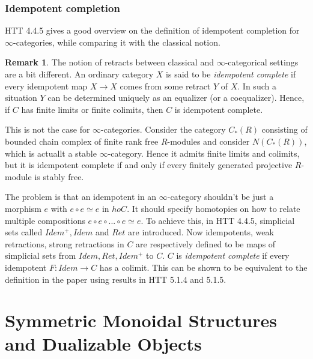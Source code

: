 \documentclass[letterpaper]{article}
\theoremstyle{definition}
\newtheorem{remark}[lemma]{Remark}
\begin{document}
\subsubsection{Idempotent completion}

HTT 4.4.5 gives a good overview on the definition of idempotent completion for $\infty$-categories, while comparing it with the classical notion.

\begin{remark} The notion of retracts between classical and $\infty$-categorical settings are a bit different. An ordinary category $X$ is said to be \textit{idempotent complete} if every idempotent map $X \rightarrow X$ comes from some retract $Y$ of $X$. In such a situation $Y$ can be determined uniquely as an equalizer (or a coequalizer). Hence, if $C$ has finite limits or finite colimits, then $C$ is idempotent complete.

This is not the case for $\infty$-categories. Consider the category $C_*(R)$ consisting of bounded chain complex of finite rank free $R$-modules and consider $N(C_*(R))$, which is actuallt a stable $\infty$-category. Hence it admits finite limits and colimits, but it is idempotent complete if and only if every finitely generated projective $R$-module is stably free.

The problem is that an idempotent in an $\infty$-category shouldn't be just a morphism $e$ with $e \circ e \simeq e$ in $ho C$. It should specify homotopies on how to relate multiple compositions $e \circ e \circ ... \circ e \simeq e$. To achieve this, in HTT 4.4.5, simplicial sets called $Idem^+, Idem$ and $Ret$ are introduced. Now idempotents, weak retractions, strong retractions in $C$ are respectively defined to be maps of simplicial sets from $Idem, Ret, Idem^+$ to $C$. $C$ is \textit{idempotent complete} if every idempotent $F : Idem \rightarrow C$ has a colimit. This can be shown to be equivalent to the definition in the paper using results in HTT 5.1.4 and 5.1.5.
\end{remark}




















\section{Symmetric Monoidal Structures and Dualizable Objects}
\end{document}
